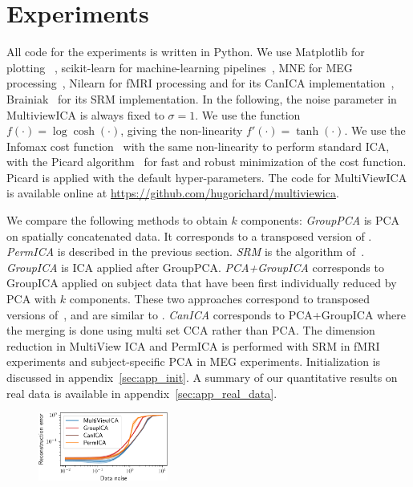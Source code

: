 
\section{Experiments}
\label{sec:expts}
All code for the experiments is written in Python.
%
We use Matplotlib for plotting~\cite{hunter2007matplotlib} , scikit-learn for
machine-learning pipelines~\cite{pedregosa2011scikit}, MNE for MEG
processing~\cite{gramfort2013meg}, Nilearn for fMRI processing and for its CanICA implementation~\cite{abraham2014machine}, Brainiak~\cite{kumar2020brainiak} for its SRM implementation. 
%
In the following, the noise parameter in MultiviewICA is always fixed to $\sigma =1$.
%
We use the function $f(\cdot)= \log\cosh(\cdot)$, giving the non-linearity $f'(\cdot) = \tanh(\cdot)$.
%
We use the Infomax cost function~\cite{bell1995information} with the same non-linearity to perform standard ICA, with the Picard algorithm~\cite{ablin2018faster} for fast and robust minimization of the cost function. Picard is applied with the default hyper-parameters.
%
The code for MultiViewICA is available online at \url{https://github.com/hugorichard/multiviewica}.
%

We compare the following methods to obtain $k$ components:
%
\emph{GroupPCA} is PCA on spatially concatenated data. It corresponds to a transposed version of \cite{smith2014group}.
%
\emph{PermICA} is described in the previous section.
%
\emph{SRM} is  the algorithm of~\cite{chen2015reduced}.
%
\emph{GroupICA} is ICA applied after GroupPCA.
%
\emph{PCA+GroupICA} corresponds to GroupICA applied on subject data that have been first individually reduced by PCA with $k$ components. 
%
These two approaches correspond to transposed versions of~\cite{calhoun2001fmri}, and are similar to \cite{eichele2011eegift}.
\emph{CanICA} corresponds to PCA+GroupICA where the merging is done using multi set CCA rather than PCA. The dimension reduction in MultiView ICA and PermICA is performed with SRM in fMRI experiments and subject-specific PCA in MEG experiments. Initialization is discussed in appendix~\ref{sec:app_init}. A summary of our quantitative results on real data is available in appendix~\ref{sec:app_real_data}.

\begin{figure}
\label{fig:synth}
\includegraphics[width=0.38\textwidth]{figures/mvica/distance_expe.pdf}
\end{figure}

